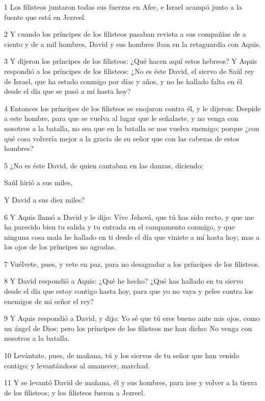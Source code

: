 \par 1 Los filisteos juntaron todas sus fuerzas en Afec, e Israel acampó junto a la fuente que está en Jezreel.
\par 2 Y cuando los príncipes de los filisteos pasaban revista a sus compañías de a ciento y de a mil hombres, David y sus hombres iban en la retaguardia con Aquis.
\par 3 Y dijeron los príncipes de los filisteos: ¿Qué hacen aquí estos hebreos? Y Aquis respondió a los príncipes de los filisteos: ¿No es éste David, el siervo de Saúl rey de Israel, que ha estado conmigo por días y años, y no he hallado falta en él desde el día que se pasó a mí hasta hoy?
\par 4 Entonces los príncipes de los filisteos se enojaron contra él, y le dijeron: Despide a este hombre, para que se vuelva al lugar que le señalaste, y no venga con nosotros a la batalla, no sea que en la batalla se nos vuelva enemigo; porque ¿con qué cosa volvería mejor a la gracia de su señor que con las cabezas de estos hombres?
\par 5 ¿No es éste David, de quien cantaban en las danzas, diciendo:
\par Saúl hirió a sus miles,
\par Y David a sus diez miles?
\par 6 Y Aquis llamó a David y le dijo: Vive Jehová, que tú has sido recto, y que me ha parecido bien tu salida y tu entrada en el campamento conmigo, y que ninguna cosa mala he hallado en ti desde el día que viniste a mí hasta hoy; mas a los ojos de los príncipes no agradas.
\par 7 Vuélvete, pues, y vete en paz, para no desagradar a los príncipes de los filisteos.
\par 8 Y David respondió a Aquis: ¿Qué he hecho? ¿Qué has hallado en tu siervo desde el día que estoy contigo hasta hoy, para que yo no vaya y pelee contra los enemigos de mi señor el rey?
\par 9 Y Aquis respondió a David, y dijo: Yo sé que tú eres bueno ante mis ojos, como un ángel de Dios; pero los príncipes de los filisteos me han dicho: No venga con nosotros a la batalla.
\par 10 Levántate, pues, de mañana, tú y los siervos de tu señor que han venido contigo; y levantándoos al amanecer, marchad.
\par 11 Y se levantó David de mañana, él y sus hombres, para irse y volver a la tierra de los filisteos; y los filisteos fueron a Jezreel.

